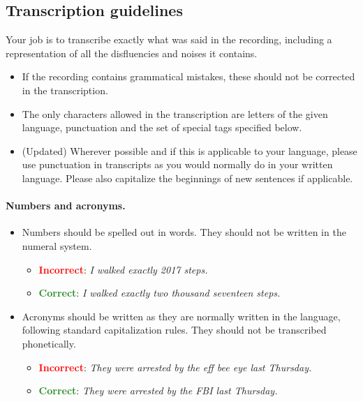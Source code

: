 \subsection{Transcription guidelines}\label{appx:guideline:transcript}
Your job is to transcribe exactly what was said in the recording, including a representation of all the disfluencies and noises it contains.
\begin{itemize}
    \item If the recording contains grammatical mistakes, these should not be corrected in the transcription.
    \item The only characters allowed in the transcription are letters of the given language, punctuation and the set of special tags specified below.
    \item (Updated) Wherever possible and if this is applicable to your language, please use punctuation in transcripts as you would normally do in your written language. Please also capitalize the beginnings of new sentences if applicable.
\end{itemize}

\paragraph{Numbers and acronyms.}
\begin{itemize}
    \item Numbers should be spelled out in words. They should not be written in the numeral system.
    \begin{itemize}
        \item \textcolor{red}{\textbf{Incorrect}}: \textit{I walked exactly 2017 steps.}
        \item \textcolor{ForestGreen}{\textbf{Correct}}: \textit{I walked exactly two thousand seventeen steps.}
    \end{itemize}
    \item Acronyms should be written as they are normally written in the language, following standard capitalization rules. They should not be transcribed phonetically.
    \begin{itemize}
        \item \textcolor{red}{\textbf{Incorrect}}: \textit{They were arrested by the eff bee eye last Thursday.}
        \item \textcolor{ForestGreen}{\textbf{Correct}}: \textit{They were arrested by the FBI last Thursday.}
    \end{itemize}
\end{itemize}

